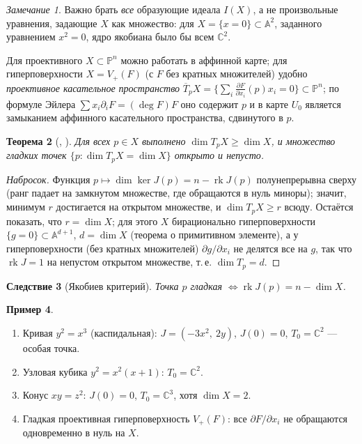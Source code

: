 \documentclass[11pt,a4paper]{article}
\theoremstyle{plain}
\newtheorem{theorem}{Теорема}[section]
\newtheorem{corollary}[theorem]{Следствие}
\theoremstyle{definition}
\newtheorem{example}[theorem]{Пример}
\theoremstyle{remark}
\newtheorem{remark}[theorem]{Замечание}
\renewcommand{\C}{\mathbb{C}}
\newcommand{\PP}{\mathbb{P}}
\newcommand{\A}{\mathbb{A}}
\DeclareMathOperator{\rk}{rk}
\begin{document}
\begin{remark}
Важно брать \emph{все} образующие идеала $I(X)$, а не произвольные уравнения, задающие $X$ как
множество: для $X=\{x=0\}\subset\A^2$, заданного уравнением $x^2=0$, ядро якобиана было бы всем
$\C^2$.
\end{remark}

Для проективного $X\subset\PP^n$ можно работать в аффинной карте; для гиперповерхности
$X=V_+(F)$ (с $F$ без кратных множителей) удобно \emph{проективное касательное пространство}
$\overline{T}_pX=\{\sum_i\frac{\partial F}{\partial x_i}(p)x_i=0\}\subset\PP^n$; по формуле Эйлера
$\sum x_i\partial_iF=(\deg F)F$ оно содержит $p$ и в карте $U_0$ является замыканием аффинного
касательного пространства, сдвинутого в $p$.

\begin{theorem}[{\cite[II.1.4]{Sh}, \cite[I.5.3]{Ha}}]\label{thm:dimT}
Для всех $p\in X$ выполнено $\dim T_pX\ge\dim X$, и множество гладких точек
$\{p:\dim T_pX=\dim X\}$ открыто и непусто.
\end{theorem}
\begin{proof}[Набросок]
Функция $p\mapsto\dim\ker J(p)=n-\rk J(p)$ полунепрерывна сверху (ранг падает на замкнутом
множестве, где обращаются в нуль миноры); значит, минимум $r$ достигается на открытом множестве,
и $\dim T_pX\ge r$ всюду. Остаётся показать, что $r=\dim X$; для этого $X$ бирационально
гиперповерхности $\{g=0\}\subset\A^{d+1}$, $d=\dim X$ (теорема о примитивном элементе), а
у гиперповерхности (без кратных множителей) $\partial g/\partial x_i$ не делятся все на $g$, так
что $\rk J=1$ на непустом открытом множестве, т.\,е. $\dim T_p=d$.
\end{proof}

\begin{corollary}[Якобиев критерий]
Точка $p$ гладкая $\iff\rk J(p)=n-\dim X$.
\end{corollary}

\begin{example}
\begin{enumerate}
\item Кривая $y^2=x^3$ (каспидальная): $J=(-3x^2,\ 2y)$, $J(0)=0$, $T_0=\C^2$ --- особая точка.
\item Узловая кубика $y^2=x^2(x+1)$: $T_0=\C^2$.
\item Конус $xy=z^2$: $J(0)=0$, $T_0=\C^3$, хотя $\dim X=2$.
\item Гладкая проективная гиперповерхность $V_+(F)$: все $\partial F/\partial x_i$ не обращаются
одновременно в нуль на $X$.
\end{enumerate}
\end{example}
\end{document}

